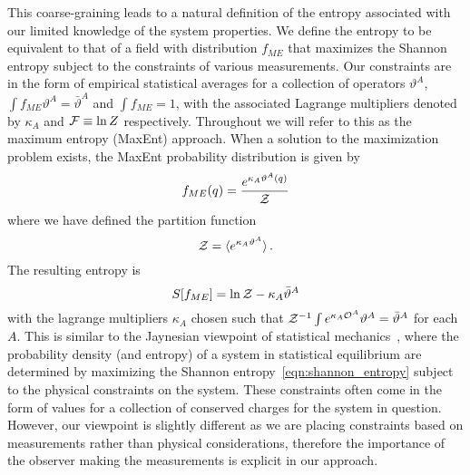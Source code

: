\documentclass[11pt,a4paper]{article}
\def\avrg#1{{\langle #1 \rangle}}
\begin{document}
This coarse-graining leads to a natural definition of the entropy associated with our limited knowledge of the system properties.
We define the entropy to be equivalent to that of a field with distribution $f_{ME}$ that maximizes the Shannon entropy subject to the constraints of various measurements.
Our constraints are in the form of empirical statistical averages for a collection of operators $\vartheta^A$, $\int f_{ME} \vartheta^A = \bar{\vartheta}^A$ and $\int f_{ME} = 1$,
with the associated Lagrange multipliers denoted by $\kappa_A$ and ${\cal F} \equiv \ln Z$ respectively.
Throughout we will refer to this as the maximum entropy (MaxEnt) approach.
When a solution to the maximization problem exists, the MaxEnt probability distribution is given by
\begin{equation}
  f_{ME}(q) = \frac{e^{\kappa_A\vartheta^A(q)}}{\cal Z}
\end{equation}
where we have defined the partition function
\begin{equation}
  {\cal Z} = \langle e^{\kappa_A\vartheta^A} \rangle \, .
  \label{eqn:partfunc_constraints}
\end{equation}
The resulting entropy is
\begin{equation}
  S[f_{ME}] = \ln{\cal Z} - \kappa_A\bar{\vartheta}^A
  \label{eqn:maxent_constraints}
\end{equation}
with the lagrange multipliers $\kappa_A$ chosen such that ${\cal Z}^{-1}\int e^{\kappa_A\mathcal{O}^A} \vartheta^A = \bar{\vartheta}^A$ for each $A$.
This is similar to the Jaynesian viewpoint of statistical mechanics~\cite{Jaynes:1957zz,Jaynes:1957zza}, where the probability density (and entropy) of a system in statistical equilibrium are determined by maximizing the Shannon entropy~\eqref{eqn:shannon_entropy} subject to the physical constraints on the system.
These constraints often come in the form of values for a collection of conserved charges for the system in question.
However, our viewpoint is slightly different as we are placing constraints based on measurements rather than physical considerations, therefore the importance of the observer making the measurements is explicit in our approach.
\end{document}
